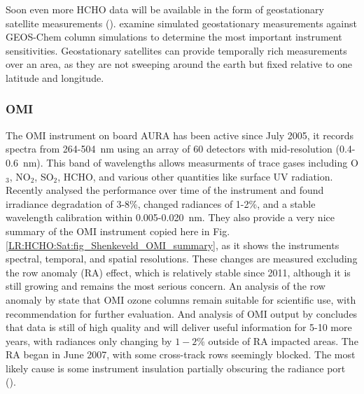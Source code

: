     Soon even more HCHO data will be available in the form of geostationary satellite measurements (\cite{Kwon2017}).
    \cite{Kwon2017} examine simulated geostationary measurements against GEOS-Chem column simulations to determine the most important instrument sensitivities.
    Geostationary satellites can provide temporally rich measurements over an area, as they are not sweeping around the earth but fixed relative to one latitude and longitude.
    
    \subsubsection{OMI}
    
    The OMI instrument on board AURA has been active since July 2005, it records spectra from 264-504~nm using an array of 60 detectors with mid-resolution (0.4-0.6~nm).
    This band of wavelengths allows measurments of trace gases including O$_3$, NO$_2$, SO$_2$, HCHO, and various other quantities like surface UV radiation.
    Recently \cite{Schenkeveld2017} analysed the performance over time of the instrument and found irradiance degradation of 3-8\%, changed radiances of 1-2\%, and a stable wavelength calibration within 0.005-0.020~nm.
    They also provide a very nice summary of the OMI instrument copied here in Fig. \ref{LR:HCHO:Sat:fig_Shenkeveld_OMI_summary}, as it shows the instruments spectral, temporal, and spatial resolutions.
    These changes are measured excluding the row anomaly (RA) effect, which is relatively stable since 2011, although it is still growing and remains the most serious concern.
    An analysis of the row anomaly by \cite{Huang2017} state that OMI ozone columns remain suitable for scientific use, with recommendation for further evaluation.
    And analysis of OMI output by \cite{Schenkeveld2017} concludes that data is still of high quality and will deliver useful information for 5-10 more years, with radiances only changing by $1-2\%$ outside of RA impacted areas.
    The RA began in June 2007, with some cross-track rows seemingly blocked. The most likely cause is some instrument insulation partially obscuring the radiance port (\cite{Schenkeveld2017}).
    
